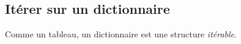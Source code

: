 \documentclass[a4paper,11pt]{article}
\begin{document}
\begin{Form}
\subsection{Itérer sur un dictionnaire}
Comme un tableau, un dictionnaire est une structure \emph{itérable}.
\begin{center}

\label{moncode}
\end{center}
\begin{center}

\label{moncode}
\end{center}
\begin{center}

\label{moncode}
\end{center}
\end{Form}
\end{document}
